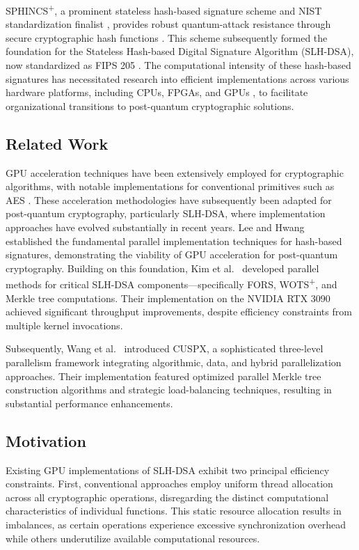 \documentclass[journal]{IEEEtran}
\begin{document}
SPHINCS\textsuperscript{+}, a prominent stateless hash-based signature scheme and NIST standardization finalist \cite{Yesina}, provides robust quantum-attack resistance through secure cryptographic hash functions \cite{Bernstein2019}. This scheme subsequently formed the foundation for the Stateless Hash-based Digital Signature Algorithm (SLH-DSA), now standardized as FIPS 205 \cite{FIPS205}. The computational intensity of these hash-based signatures has necessitated research into efficient implementations across various hardware platforms, including CPUs, FPGAs, and GPUs \cite{Joseph2022}, to facilitate organizational transitions to post-quantum cryptographic solutions.

\subsection{Related Work}

GPU acceleration techniques have been extensively employed for cryptographic algorithms, with notable implementations for conventional primitives such as AES \cite{Lee2022a}. These acceleration methodologies have subsequently been adapted for post-quantum cryptography, particularly SLH-DSA, where implementation approaches have evolved substantially in recent years.
Lee and Hwang~\cite{Lee2022} established the fundamental parallel implementation techniques for hash-based signatures, demonstrating the viability of GPU acceleration for post-quantum cryptography. Building on this foundation, Kim et al.~\cite{Kim2024} developed parallel methods for critical SLH-DSA components—specifically FORS, WOTS\textsuperscript{+}, and Merkle tree computations. Their implementation on the NVIDIA RTX 3090 achieved significant throughput improvements, despite efficiency constraints from multiple kernel invocations.

Subsequently, Wang et al.~\cite{Wang2025} introduced CUSPX, a sophisticated three-level parallelism framework integrating algorithmic, data, and hybrid parallelization approaches. Their implementation featured optimized parallel Merkle tree construction algorithms and strategic load-balancing techniques, resulting in substantial performance enhancements.

\subsection{Motivation}

Existing GPU implementations of SLH-DSA exhibit two principal efficiency constraints. First, conventional approaches employ uniform thread allocation across all cryptographic operations, disregarding the distinct computational characteristics of individual functions. This static resource allocation results in imbalances, as certain operations experience excessive synchronization overhead while others underutilize available computational resources.
\end{document}
